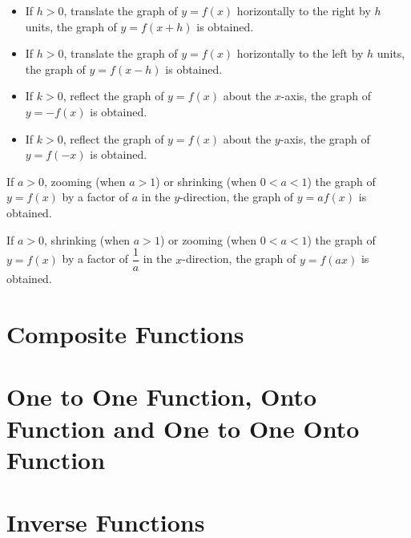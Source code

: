 \documentclass[12pt]{report}
\begin{document}
\begin{mdframed}[style=MyFrame]
  \begin{itemize}[leftmargin=0.3cm]
    \item If $h > 0$, translate the graph of $y = f(x)$ horizontally to the right by $h$
          units, the graph of $y = f(x + h)$ is obtained.

    \item If $h > 0$, translate the graph of $y = f(x)$ horizontally to the left by $h$
          units, the graph of $y = f(x - h)$ is obtained.
  \end{itemize}
\end{mdframed}

\begin{mdframed}[style=MyFrame]
  \begin{itemize}[leftmargin=0.3cm]
    \item If $k > 0$, reflect the graph of $y = f(x)$ about the $x$-axis, the graph of $y
            = -f(x)$ is obtained.

    \item If $k > 0$, reflect the graph of $y = f(x)$ about the $y$-axis, the graph of $y
            = f(-x)$ is obtained.
  \end{itemize}
\end{mdframed}

\begin{mdframed}[style=MyFrame]
  If $a > 0$, zooming (when $a > 1$) or shrinking (when $0 < a < 1$) the graph of $y = f(x)$ by a factor of $a$ in the $y$-direction, the graph of $y = af(x)$ is obtained.
\end{mdframed}

\begin{mdframed}[style=MyFrame]
  If $a > 0$, shrinking (when $a > 1$) or zooming (when $0 < a < 1$) the graph of $y = f(x)$ by a factor of $\dfrac{1}{a}$ in the $x$-direction, the graph of $y = f(ax)$ is obtained.
\end{mdframed}

\section{Composite Functions}

\section{One to One Function, Onto Function and One to One Onto Function}

\section{Inverse Functions}
\end{document}
